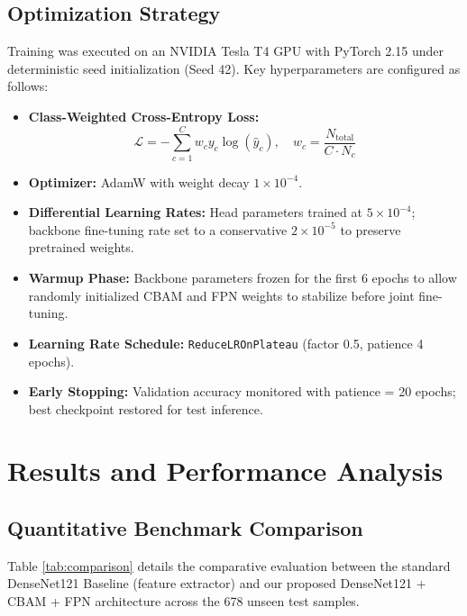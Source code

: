 \documentclass[conference]{IEEEtran}
\begin{document}
\subsection{Optimization Strategy}
Training was executed on an NVIDIA Tesla T4 GPU with PyTorch 2.15 under deterministic seed initialization (Seed 42). Key hyperparameters are configured as follows:
\begin{itemize}
    \item \textbf{Class-Weighted Cross-Entropy Loss:}
    \begin{equation}
    \mathcal{L} = -\sum_{c=1}^{C} w_c y_c \log(\hat{y}_c), \quad w_c = \frac{N_{\text{total}}}{C \cdot N_c}
    \end{equation}
    \item \textbf{Optimizer:} AdamW with weight decay $1 \times 10^{-4}$.
    \item \textbf{Differential Learning Rates:} Head parameters trained at $5 \times 10^{-4}$; backbone fine-tuning rate set to a conservative $2 \times 10^{-5}$ to preserve pretrained weights.
    \item \textbf{Warmup Phase:} Backbone parameters frozen for the first 6 epochs to allow randomly initialized CBAM and FPN weights to stabilize before joint fine-tuning.
    \item \textbf{Learning Rate Schedule:} \texttt{ReduceLROnPlateau} (factor 0.5, patience 4 epochs).
    \item \textbf{Early Stopping:} Validation accuracy monitored with patience = 20 epochs; best checkpoint restored for test inference.
\end{itemize}

\section{Results and Performance Analysis}

\subsection{Quantitative Benchmark Comparison}
Table \ref{tab:comparison} details the comparative evaluation between the standard DenseNet121 Baseline (feature extractor) and our proposed DenseNet121 + CBAM + FPN architecture across the 678 unseen test samples.
\end{document}
